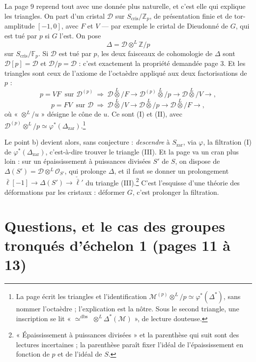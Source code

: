 \documentclass[11pt,a4paper]{article}
\begin{document}
La page 9 reprend tout avec une donnée plus naturelle, et c'est elle qui
explique les triangles. On part d'un cristal $\mathcal{D}$ sur
$S_{\mathrm{cris}}/\mathbb{Z}_{p}$, de présentation finie et de tor-amplitude
$[-1, 0]$, avec $F$ et $V$ — par exemple le cristal de Dieudonné de $G$, qui
est tué par $p$ si $G$ l'est. On pose
\[
\Delta = \mathcal{D} \otimes^{L} \mathbb{Z}/p
\]
sur $S_{\mathrm{cris}}/\mathbb{F}_{p}$. Si $\mathcal{D}$ est tué par $p$,
les deux faisceaux de cohomologie de $\Delta$ sont $\mathcal{D}[p] = \mathcal{D}$
et $\mathcal{D}/p = \mathcal{D}$ : c'est exactement la propriété demandée
page 3. Et les triangles sont ceux de l'axiome de l'octaèdre appliqué aux
deux factorisations de $p$ :
\[
p = V F \ \text{ sur } \mathcal{D}^{(p)} \ \Longrightarrow\
\mathcal{D}\overset{L}{\otimes}/F \to \mathcal{D}^{(p)}\overset{L}{\otimes}/p
\to \mathcal{D}\overset{L}{\otimes}/V \to ,
\]
\[
p = F V \ \text{ sur } \mathcal{D} \ \Longrightarrow\
\mathcal{D}\overset{L}{\otimes}/V \to \mathcal{D}\overset{L}{\otimes}/p
\to \mathcal{D}\overset{L}{\otimes}/F \to ,
\]
où « $\otimes^{L}/u$ » désigne le cône de $u$. Ce sont (I) et (II), avec
$\mathcal{D}^{(p)}\otimes^{L}/p \simeq \varphi^{*}(\Delta_{\mathrm{zar}})$.\footnote{La
page écrit les triangles et l'identification
$\mathcal{M}^{(p)}\otimes^{L}/p \simeq \varphi^{*}(\Delta^{*})$, sans nommer
l'octaèdre ; l'explication est la nôtre. Sous le second triangle, une
inscription se lit « $\simeq^{\mathrm{dbs}}$ $\otimes^{L}\Delta^{*}(\mathcal{M})$ »,
de lecture douteuse.}

Le point b) devient alors, sans conjecture : \emph{descendre} à
$S_{\mathrm{zar}}$, via $\varphi$, la filtration (I) de
$\varphi^{*}(\Delta_{\mathrm{zar}})$, c'est-à-dire trouver le triangle (III).
Et la page va un cran plus loin : sur un épaississement à puissances divisées
$S'$ de $S$, on dispose de $\Delta(S') = \mathcal{D} \otimes^{L}
\mathcal{O}_{S'}$, qui prolonge $\Delta$, et il faut se donner un prolongement
$\bar\ell[-1] \to \Delta(S') \to \check{\bar\ell}'$ du triangle
(III).\footnote{« Épaississement à puissances divisées » et la parenthèse qui
suit sont des lectures incertaines ; la parenthèse paraît fixer l'idéal de
l'épaississement en fonction de $p$ et de l'idéal de $S$.} C'est l'esquisse
d'une théorie des déformations par les cristaux : déformer $G$, c'est
prolonger la filtration.

\section*{Questions, et le cas des groupes tronqués d'échelon 1 (pages 11 à 13)}
\end{document}
